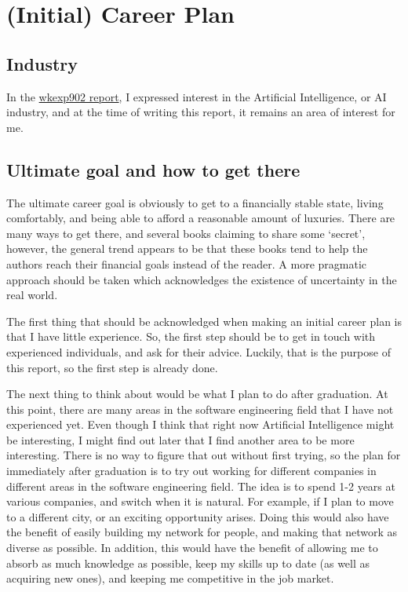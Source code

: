 \section{(Initial) Career Plan}

\subsection{Industry}
In the
\href{https://github.com/Arunscape/LaTeX-Stuff/blob/a732f319e8a6526f036bd424fa24f66941f09a5a/Work-Term-Reports/wkexp902/report.pdf}{wkexp902
report}, 
I expressed interest in the Artificial Intelligence, or AI industry, and at the
time of writing this report, it remains an area of interest for me. 


\subsection{Ultimate goal and how to get there} 
The ultimate career goal is obviously to get to a financially stable state,
living comfortably, and being able to afford a reasonable amount of luxuries.
There are many ways to get there, and several books claiming to share some
`secret', however, the general trend appears to be that these books tend to help
the authors reach their financial goals instead of the reader. A more pragmatic
approach should be taken which acknowledges the existence of uncertainty in the
real world. 

The first thing that should be acknowledged when making an initial career plan
is that I have little experience. So, the first step should be to get in touch
with experienced individuals, and ask for their advice. Luckily, that is the
purpose of this report, so the first step is already done.

The next thing to think about would be what I plan to do after graduation.
At this point, there are many areas in the software engineering field that I 
have not experienced yet. Even though I think that right now Artificial
Intelligence might be interesting, I might find out later that I find another
area to be more interesting. There is no way to figure that out without first
trying, so the plan for immediately after graduation is to try out working for
different companies in different areas in the software engineering field. 
The idea is to spend 1-2 years at various companies, and switch when it is
natural. For example, if I plan to move to a different city, or an exciting
opportunity arises. Doing this would also have the benefit of easily building
my network for people, and making that network as diverse as possible. In 
addition, this would have the benefit of allowing me to absorb as much knowledge
as possible, keep my skills up to date (as well as acquiring new ones), and
keeping me competitive in the job market. 

